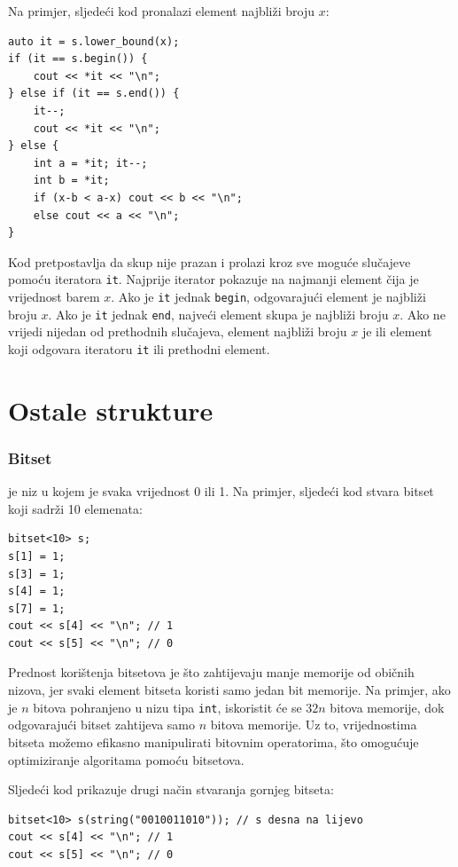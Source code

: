 \begin{samepage}
Na primjer, sljedeći kod pronalazi element
najbliži broju $x$:

\begin{lstlisting}
auto it = s.lower_bound(x);
if (it == s.begin()) {
    cout << *it << "\n";
} else if (it == s.end()) {
    it--;
    cout << *it << "\n";
} else {
    int a = *it; it--;
    int b = *it;
    if (x-b < a-x) cout << b << "\n";
    else cout << a << "\n";
}
\end{lstlisting}

Kod pretpostavlja da skup nije prazan
i prolazi kroz sve moguće slučajeve
pomoću iteratora \texttt{it}.
Najprije iterator pokazuje na najmanji
element čija je vrijednost barem $x$.
Ako je \texttt{it} jednak \texttt{begin},
odgovarajući element je najbliži broju $x$.
Ako je \texttt{it} jednak \texttt{end},
najveći element skupa je najbliži broju $x$.
Ako ne vrijedi nijedan od prethodnih slučajeva,
element najbliži broju $x$ je ili
element koji odgovara iteratoru \texttt{it} ili prethodni element.
\end{samepage}

\section{Ostale strukture}

\subsubsection{Bitset}


 je niz
u kojem je svaka vrijednost 0 ili 1.
Na primjer, sljedeći kod stvara
bitset koji sadrži 10 elemenata:
\begin{lstlisting}
bitset<10> s;
s[1] = 1;
s[3] = 1;
s[4] = 1;
s[7] = 1;
cout << s[4] << "\n"; // 1
cout << s[5] << "\n"; // 0
\end{lstlisting}

Prednost korištenja bitsetova je što
zahtijevaju manje memorije od običnih nizova,
jer svaki element bitseta koristi
samo jedan bit memorije.
Na primjer,
ako je $n$ bitova pohranjeno u nizu tipa \texttt{int},
iskoristit će se $32n$ bitova memorije,
dok odgovarajući bitset zahtijeva samo $n$ bitova memorije.
Uz to, vrijednostima bitseta
možemo efikasno manipulirati
bitovnim operatorima, što omogućuje
optimiziranje algoritama pomoću bitsetova.

Sljedeći kod prikazuje drugi način stvaranja gornjeg bitseta:
\begin{lstlisting}
bitset<10> s(string("0010011010")); // s desna na lijevo
cout << s[4] << "\n"; // 1
cout << s[5] << "\n"; // 0
\end{lstlisting}

